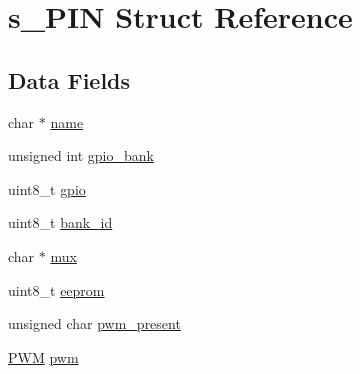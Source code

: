 \hypertarget{structs___p_i_n}{\section{s\-\_\-\-P\-I\-N Struct Reference}
\label{structs___p_i_n}
}
\subsection*{Data Fields}
\begin{DoxyCompactItemize}
\item 
char $\ast$ \hyperlink{structs___p_i_n_a5ac083a645d964373f022d03df4849c8}{name}
\item 
unsigned int \hyperlink{structs___p_i_n_a51c31aad6d06ea919700fb1a180688bd}{gpio\-\_\-bank}
\item 
uint8\-\_\-t \hyperlink{structs___p_i_n_a80b2e88e969b3ee6cde0d4380eadc5dd}{gpio}
\item 
uint8\-\_\-t \hyperlink{structs___p_i_n_a9ef376f6d84af9699e87709d7662cf74}{bank\-\_\-id}
\item 
char $\ast$ \hyperlink{structs___p_i_n_a268ae5ca019047bc0bc32f45f6e4c8a0}{mux}
\item 
uint8\-\_\-t \hyperlink{structs___p_i_n_a7589e79ff8d69f5bff025fe44090cc6a}{eeprom}
\item 
unsigned char \hyperlink{structs___p_i_n_ad9d4ffb703dd541884e772f4490febd9}{pwm\-\_\-present}
\item 
\hyperlink{structs___p_w_m}{P\-W\-M} \hyperlink{structs___p_i_n_a6208909b76c84a75b931c78e24a0cc42}{pwm}
\end{DoxyCompactItemize}


